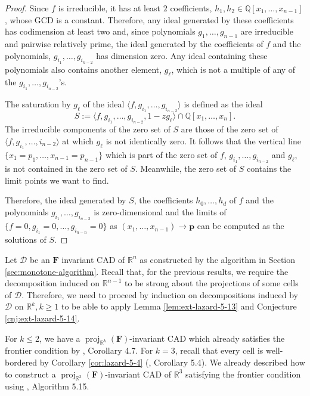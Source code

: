 \documentclass[
]{book}
\theoremstyle{definition}
\theoremstyle{definition}
\theoremstyle{definition}
\theoremstyle{definition}
\theoremstyle{remark}
\begin{document}
\begin{proof}
Since \(f\) is irreducible, it has at least \(2\) coefficients, \(h_1,h_2 \in \mathbb{Q}[x_1,\ldots,x_{n-1}]\), whose GCD is a constant.
Therefore, any ideal generated by these coefficients has codimension at least two and, since polynomials \(g_1,\ldots,g_{n-1}\) are irreducible and pairwise relatively prime, the ideal generated by the coefficients of \(f\) and the polynomials, \(g_{i_1},\ldots,g_{i_{n-2}}\) has dimension zero.
Any ideal containing these polynomials also contains another element, \(g_\ell\), which is not a multiple of any of the \(g_{i_1},\ldots,g_{i_{n-2}}\)'s.

The saturation by \(g_\ell\) of the ideal \(\langle f, g_{i_1}, \ldots, g_{i_{n-2}} \rangle\) is defined as the ideal
\[
S := \langle f, g_{i_1}, \ldots, g_{i_{n-2}}, 1 - z g_\ell \rangle \cap \mathbb{Q}[x_1,\ldots,x_n].
\]
The irreducible components of the zero set of \(S\) are those of the zero set of \(\langle f,g_{i_1},\ldots,i_{n-2} \rangle\) at which \(g_\ell\) is not identically zero. It follows that the vertical line \(\{ x_1 = p_1, \ldots, x_{n-1} = p_{n-1} \}\) which is part of the zero set of \(f\),
\(g_{i_1},\ldots,g_{i_{n-2}}\) and \(g_\ell\), is not contained in the zero set of \(S\).
Meanwhile, the zero set of \(S\) contains the limit points we want to find.

Therefore, the ideal generated by \(S\), the coefficients \(h_0,\ldots,h_d\) of \(f\) and the polynomials \(g_{i_1},\ldots,g_{i_{n-2}}\) is zero-dimensional and the limits of \(\{ f = 0, g_{i_1} = 0, \ldots, g_{i_{n-n}} = 0 \}\) as \((x_1,\ldots,x_{n-1}) \to \mathbf{p}\) can be computed as the solutions of \(S\).
\end{proof}

Let \(\mathcal{D}\) be an \(\mathbf{F}\) invariant CAD of \(\mathbb{R}^n\) as constructed by the algorithm in Section \ref{sec:monotone-algorithm}.
Recall that, for the previous results, we require the decomposition induced on \(\mathbb{R}^{n-1}\) to be strong about the projections of some cells of \(\mathcal{D}\). Therefore, we need to proceed by induction on decompositions induced by \(\mathcal{D}\) on \(\mathbb{R}^k, k \ge 1\) to be able to apply Lemma \ref{lem:ext-lazard-5-13} and Conjecture \ref{cnj:ext-lazard-5-14}.

For \(k\le 2\), we have a \({\operatorname{proj}_{\mathbb{R}^{k}}}(\mathbf{F})\)-invariant CAD which already satisfies the frontier condition by \citet{lazard10}, Corollary 4.7.
For \(k=3\), recall that every cell is well-bordered by Corollary \ref{cor:lazard-5-4} (\citet{lazard10}, Corollary 5.4). We already described how to construct a \({\operatorname{proj}_{\mathbb{R}^{3}}}(\mathbf{F})\)-invariant CAD of \(\mathbb{R}^3\) satisfying the frontier condition using \citet{lazard10}, Algorithm 5.15.
\end{document}

